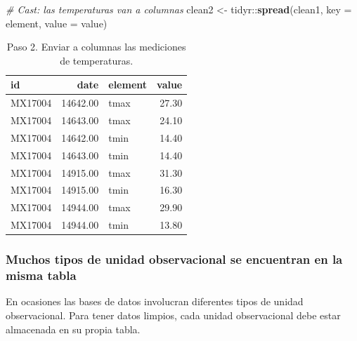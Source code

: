 \documentclass[]{article}
\newenvironment{Shaded}{\begin{snugshade}}{\end{snugshade}}
\newcommand{\KeywordTok}[1]{\textcolor[rgb]{0.13,0.29,0.53}{\textbf{{#1}}}}
\newcommand{\DataTypeTok}[1]{\textcolor[rgb]{0.13,0.29,0.53}{{#1}}}
\newcommand{\DecValTok}[1]{\textcolor[rgb]{0.00,0.00,0.81}{{#1}}}
\newcommand{\StringTok}[1]{\textcolor[rgb]{0.31,0.60,0.02}{{#1}}}
\newcommand{\CommentTok}[1]{\textcolor[rgb]{0.56,0.35,0.01}{\textit{{#1}}}}
\newcommand{\OtherTok}[1]{\textcolor[rgb]{0.56,0.35,0.01}{{#1}}}
\newcommand{\NormalTok}[1]{{#1}}
\begin{document}
\begin{Shaded}
\begin{Highlighting}[]
\CommentTok{# Cast: las temperaturas van a columnas}
\NormalTok{clean2 <-}\StringTok{ }\NormalTok{tidyr::}\KeywordTok{spread}\NormalTok{(clean1, }\DataTypeTok{key =} \NormalTok{element, }\DataTypeTok{value =} \NormalTok{value)}
\end{Highlighting}
\end{Shaded}

\begin{table}[ht]
\centering
\begin{tabular}{lrlr}
  \hline
id & date & element & value \\ 
  \hline
MX17004 & 14642.00 & tmax & 27.30 \\ 
  MX17004 & 14643.00 & tmax & 24.10 \\ 
  MX17004 & 14642.00 & tmin & 14.40 \\ 
  MX17004 & 14643.00 & tmin & 14.40 \\ 
  MX17004 & 14915.00 & tmax & 31.30 \\ 
  MX17004 & 14915.00 & tmin & 16.30 \\ 
  MX17004 & 14944.00 & tmax & 29.90 \\ 
  MX17004 & 14944.00 & tmin & 13.80 \\ 
   \hline
\end{tabular}
\caption{Paso 2. Enviar a columnas las mediciones de temperaturas.} 
\label{tab:clima1}
\end{table}

\subsubsection{Muchos tipos de unidad observacional se encuentran en la
misma
tabla}\label{muchos-tipos-de-unidad-observacional-se-encuentran-en-la-misma-tabla}

En ocasiones las bases de datos involucran diferentes tipos de unidad
observacional. Para tener datos limpios, cada unidad observacional debe
estar almacenada en su propia tabla.

\begin{Shaded}
\end{Shaded}
\end{document}

